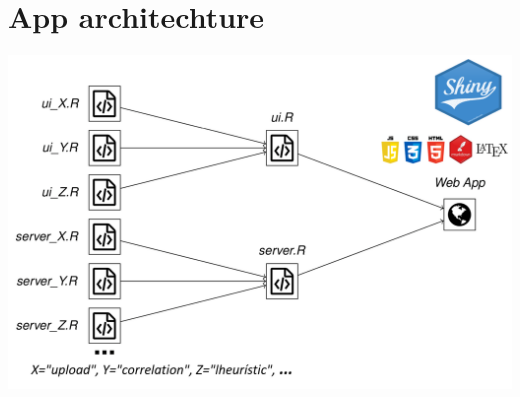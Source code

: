 \section{App architechture}

\begin{center}
	\includegraphics[width=0.5\columnwidth]{./images/architecture2.png}
\end{center}

